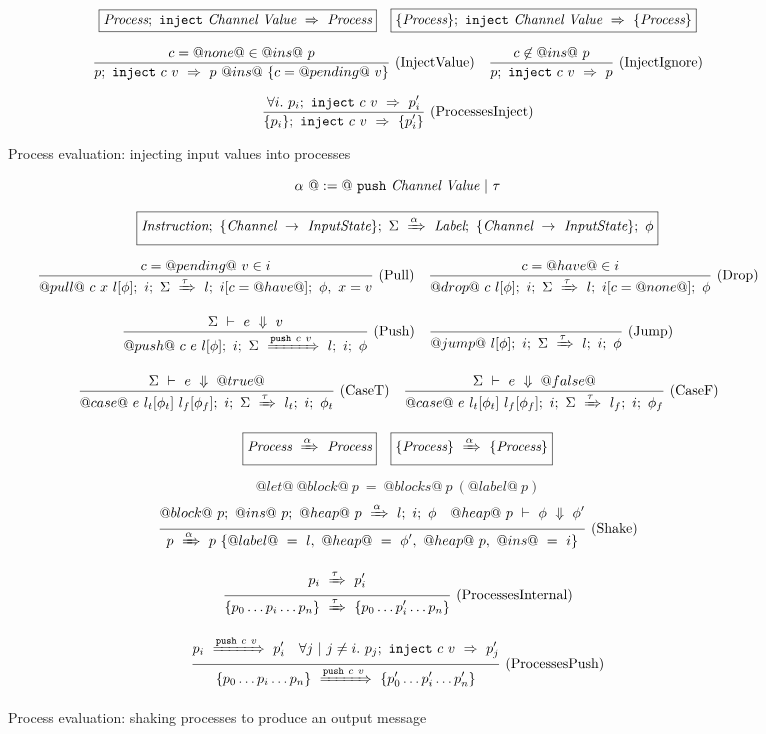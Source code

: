 
\begin{figure}

$$
\begin{array}{lr} 
  \boxed{\textit{Process};~\texttt{inject}~\textit{Channel}~\textit{Value}~\Rightarrow~\textit{Process}}
 & 
  \boxed{\{ \textit{Process} \};~\texttt{inject}~\textit{Channel}~\textit{Value}~\Rightarrow~\{ \textit{Process} \}}
 \end{array}
$$

$$
\enskip \frac {\displaystyle 
  c=@none@ \in @ins@~p
} {\displaystyle 
  p;~\texttt{inject}~c~v~\Rightarrow~p ~@ins@~ \{ c = @pending@~v\}
} \  \mbox{(InjectValue)} \enskip
\enskip \frac {\displaystyle 
  c \not\in @ins@~p
} {\displaystyle 
  p;~\texttt{inject}~c~v~\Rightarrow~p
} \  \mbox{(InjectIgnore)} \enskip
$$

$$
\enskip \frac {\displaystyle 
  \forall i.~ p_i;~\texttt{inject}~c~v~\Rightarrow~p'_i
} {\displaystyle 
  \{ p_i \};~\texttt{inject}~c~v~\Rightarrow~\{ p'_i \}
} \  \mbox{(ProcessesInject)} \enskip
$$

\caption{Process evaluation: injecting input values into processes}
\label{fig:Process:Eval:Inject}
\end{figure}


\begin{figure}

$$
\alpha~@:=@~ \texttt{push}~\textit{Channel}~\textit{Value} ~|~ \tau
$$

$$
  \boxed{
    \textit{Instruction};~\{\textit{Channel} ~\to~ \textit{InputState}\};~\Sigma~\xRightarrow{\alpha}~\textit{Label};~\{\textit{Channel} ~\to~ \textit{InputState}\};~\phi
  }
$$


$$
\enskip \frac {\displaystyle 
  c=@pending@~v \in i
} {\displaystyle 
  @pull@~c~x~l[\phi];~i;~\Sigma~\xRightarrow{\tau}~l;~i[c=@have@];~\phi,~x = v
} \  \mbox{(Pull)} \enskip
\enskip \frac {\displaystyle 
  c=@have@ \in i
} {\displaystyle 
  @drop@~c~l[\phi];~i;~\Sigma~\xRightarrow{\tau}~l;~i[c=@none@];~\phi
} \  \mbox{(Drop)} \enskip
$$

$$
\enskip \frac {\displaystyle 
  \Sigma~\vdash~e~\Downarrow~v
} {\displaystyle 
  @push@~c~e~l[\phi];~i;~\Sigma~\xRightarrow{\texttt{push}~c~v}~l;~i;~\phi
} \  \mbox{(Push)} \enskip
\enskip \frac {\displaystyle 
} {\displaystyle 
  @jump@~l[\phi];~i;~\Sigma~\xRightarrow{\tau}~l;~i;~\phi
} \  \mbox{(Jump)} \enskip
$$

$$
\enskip \frac {\displaystyle 
  \Sigma~\vdash~e~\Downarrow~@true@
} {\displaystyle 
  @case@~e~l_t[\phi_t]~l_f[\phi_f];~i;~\Sigma~\xRightarrow{\tau}~l_t;~i;~\phi_t
} \  \mbox{(CaseT)} \enskip
\enskip \frac {\displaystyle 
  \Sigma~\vdash~e~\Downarrow~@false@
} {\displaystyle 
  @case@~e~l_t[\phi_t]~l_f[\phi_f];~i;~\Sigma~\xRightarrow{\tau}~l_f;~i;~\phi_f
} \  \mbox{(CaseF)} \enskip
$$

$$
  \boxed{\textit{Process}~\xRightarrow{\alpha}~\textit{Process}}
  \quad
  \boxed{\{ \textit{Process} \}~\xRightarrow{\alpha}~\{ \textit{Process} \}}
$$

$$
@let@~@block@~p~=~@blocks@~p~(@label@~p)
$$
$$
\enskip \frac {\displaystyle 
  @block@~p;~@ins@~p;~@heap@~p~\xRightarrow{\alpha}~l;~i;~\phi
  \quad
    @heap@~p~\vdash~\phi~\Downarrow~\phi'
} {\displaystyle 
  p~\xRightarrow{\alpha}~p~\{ @label@~=~l,~@heap@~=~\phi',~@heap@~p,~@ins@~=~i \}
} \  \mbox{(Shake)} \enskip
$$




$$
\ruleIN{
  \ProcShake{p_i}{\tau}{p'_i}
}{
  \ProcsShake{
    \sgl{p_0 \ldots p_i \ldots p_n}
  }{\tau}{
    \sgl{p_0 \ldots p'_i \ldots p_n}
  }
}{ProcessesInternal}
$$

$$
\ruleIN{
  \ProcShake{p_i}{\Push~c~v}{p'_i}
  \quad
  \forall j~|~j \neq i.~
  \ProcInject{p_j}{c}{v}{p'_j}
}{
  \ProcsShake{
    \sgl{p_0 \ldots p_i \ldots p_n}
  }{\Push~c~v}{
    \sgl{p'_0 \ldots p'_i \ldots p'_n}
  }
}{ProcessesPush}
$$


\caption{Process evaluation: shaking processes to produce an output message}
\label{fig:Process:Eval:Shake}
\end{figure}

